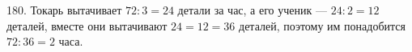 180. Токарь вытачивает $72:3=24$ детали за час, а его ученик --- $24:2=12$ деталей, вместе они вытачивают $24=12=36$ деталей, поэтому им понадобится $72:36=2$ часа.\\
